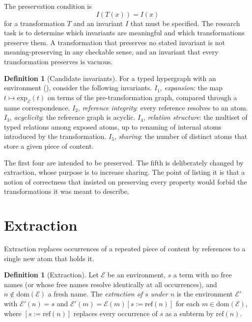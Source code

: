\documentclass[11pt,twoside,openright]{book}
\theoremstyle{plain}
\theoremstyle{definition}
\newtheorem{definition}[theorem]{Definition}
\theoremstyle{remark}
\begin{document}
The preservation condition is
\[
I(T(x))=I(x)
\]
for a transformation $T$ and an invariant $I$ that must be specified. The research task is to determine which invariants are meaningful and which transformations preserve them. A transformation that preserves no stated invariant is not meaning-preserving in any checkable sense, and an invariant that every transformation preserves is vacuous.

\begin{definition}[Candidate invariants]\label{def:invariants}
For a typed hypergraph with an environment (), consider the following invariants.
$I_1$, \emph{expansion}: the map $t\mapsto\mathrm{exp}_\mathcal{E}(t)$ on terms of the pre-transformation graph, compared through a name correspondence.
$I_2$, \emph{reference integrity}: every reference resolves to an atom.
$I_3$, \emph{acyclicity}: the reference graph is acyclic.
$I_4$, \emph{relation structure}: the multiset of typed relations among exposed atoms, up to renaming of internal atoms introduced by the transformation.
$I_5$, \emph{sharing}: the number of distinct atoms that store a given piece of content.
\end{definition}

The first four are intended to be preserved. The fifth is deliberately changed by extraction, whose purpose is to increase sharing. The point of listing it is that a notion of correctness that insisted on preserving every property would forbid the transformations it was meant to describe.

\section{Extraction}

Extraction replaces occurrences of a repeated piece of content by references to a single new atom that holds it.

\begin{definition}[Extraction]\label{def:extraction}
Let $\mathcal{E}$ be an environment, $s$ a term with no free names (or whose free names resolve identically at all occurrences), and $n\notin\mathrm{dom}(\mathcal{E})$ a fresh name. The \emph{extraction of $s$ under $n$} is the environment $\mathcal{E}'$ with $\mathcal{E}'(n)=s$ and $\mathcal{E}'(m)=\mathcal{E}(m)[s:=\mathrm{ref}(n)]$ for each $m\in\mathrm{dom}(\mathcal{E})$, where $[s:=\mathrm{ref}(n)]$ replaces every occurrence of $s$ as a subterm by $\mathrm{ref}(n)$.
\end{definition}
\end{document}
